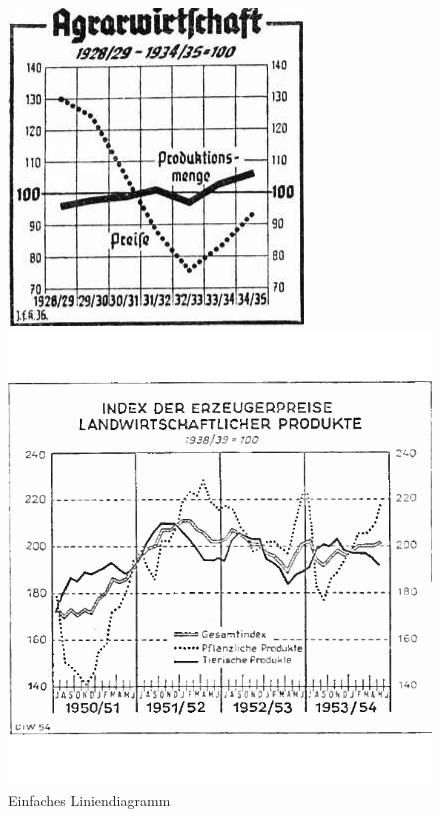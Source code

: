 \begin{figure}[H] %
    \centering
    \begin{minipage}{0.315\textwidth} %
        \centering
        \includegraphics[width=\linewidth]{Experimente/img/easy.png}
        \caption{ Einfaches Liniendiagramm}
        \label{fig:easy}
    \end{minipage}\hfill %
    \begin{minipage}{0.315\textwidth} %
        \centering
        \includegraphics[width=\linewidth]{Experimente/img/medium.png}

\end{minipage}
\end{figure}
